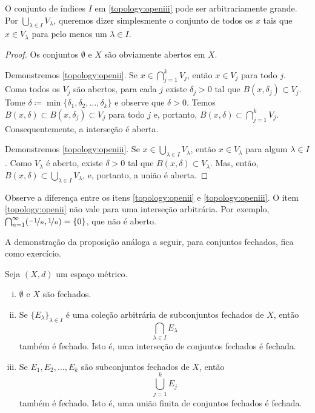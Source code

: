 O conjunto de índices $I$ em \ref{topology:openiii} pode ser arbitrariamente
grande.
Por $\bigcup_{\lambda \in I} V_\lambda$, queremos dizer simplesmente o
conjunto de todos os $x$ tais que $x \in V_\lambda$ para pelo menos um
$\lambda \in I$.

\begin{proof}
Os conjuntos $\emptyset$ e $X$ são obviamente abertos em $X$.

Demonstremos \ref{topology:openii}.
Se $x \in \bigcap_{j=1}^k V_j$, então $x \in V_j$ para todo $j$.
Como todos os $V_j$ são abertos, para cada $j$ existe $\delta_j > 0$ tal que
$B(x,\delta_j) \subset V_j$. Tome $\delta \coloneqq \min \{
\delta_1,\delta_2,\ldots,\delta_k \}$ e observe que $\delta > 0$. Temos
$B(x,\delta) \subset B(x,\delta_j) \subset V_j$ para todo $j$ e, portanto,
$B(x,\delta) \subset \bigcap_{j=1}^k V_j$. Consequentemente, a interseção é
aberta.

Demonstremos \ref{topology:openiii}.
Se $x \in \bigcup_{\lambda \in I} V_\lambda$, então $x \in V_\lambda$ para
algum $\lambda \in I$.
Como $V_\lambda$ é aberto, existe $\delta > 0$ tal que
$B(x,\delta) \subset V_\lambda$. Mas, então,
$B(x,\delta) \subset \bigcup_{\lambda \in I} V_\lambda$,
e, portanto, a união é aberta.
\end{proof}

\begin{example}
Observe a diferença entre os
itens
\ref{topology:openii} e \ref{topology:openiii}.
O item \ref{topology:openii} não vale para uma interseção arbitrária.
Por exemplo,
$\bigcap_{n=1}^\infty (\nicefrac{-1}{n},\nicefrac{1}{n}) = \{ 0 \}$,
que não é aberto.
\end{example}


A demonstração da proposição análoga a seguir, para conjuntos fechados,
fica como exercício.

\begin{prop} \label{prop:topology:closed}
\pagebreak[2]
Seja $(X,d)$ um espaço métrico.
\begin{enumerate}[(i)]
\item \label{topology:closedi} $\emptyset$ e $X$ são fechados.
\item \label{topology:closedii} Se $\{ E_\lambda \}_{\lambda \in I}$ é
uma coleção arbitrária de subconjuntos fechados de $X$, então
\begin{equation*}
\bigcap_{\lambda \in I} E_\lambda
\end{equation*}
também é fechado. Isto é, uma interseção de conjuntos fechados é fechada.
\item \label{topology:closediii} Se $E_1, E_2, \ldots, E_k$ são
subconjuntos fechados de $X$, então
\begin{equation*}
\bigcup_{j=1}^k E_j
\end{equation*}
também é fechado. Isto é, uma união finita de conjuntos fechados é fechada.
\end{enumerate}
\end{prop}


